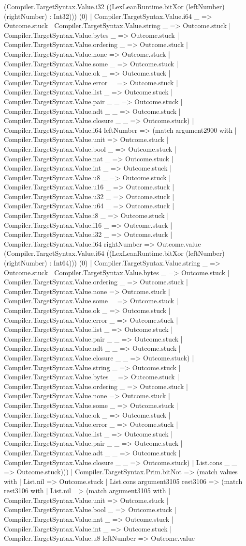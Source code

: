 \documentclass[11pt]{article}
\begin{document}
(Compiler.TargetSyntax.Value.i32 ((LexLeanRuntime.bitXor (leftNumber) (rightNumber) : Int32))) (0) | Compiler.TargetSyntax.Value.i64 \_ => Outcome.stuck | Compiler.TargetSyntax.Value.string \_ => Outcome.stuck | Compiler.TargetSyntax.Value.bytes \_ => Outcome.stuck | Compiler.TargetSyntax.Value.ordering \_ => Outcome.stuck | Compiler.TargetSyntax.Value.none => Outcome.stuck | Compiler.TargetSyntax.Value.some \_ => Outcome.stuck | Compiler.TargetSyntax.Value.ok \_ => Outcome.stuck | Compiler.TargetSyntax.Value.error \_ => Outcome.stuck | Compiler.TargetSyntax.Value.list \_ => Outcome.stuck | Compiler.TargetSyntax.Value.pair \_ \_ => Outcome.stuck | Compiler.TargetSyntax.Value.adt \_ \_ => Outcome.stuck | Compiler.TargetSyntax.Value.closure \_ \_ => Outcome.stuck) | Compiler.TargetSyntax.Value.i64 leftNumber => (match argument2900 with | Compiler.TargetSyntax.Value.unit => Outcome.stuck | Compiler.TargetSyntax.Value.bool \_ => Outcome.stuck | Compiler.TargetSyntax.Value.nat \_ => Outcome.stuck | Compiler.TargetSyntax.Value.int \_ => Outcome.stuck | Compiler.TargetSyntax.Value.u8 \_ => Outcome.stuck | Compiler.TargetSyntax.Value.u16 \_ => Outcome.stuck | Compiler.TargetSyntax.Value.u32 \_ => Outcome.stuck | Compiler.TargetSyntax.Value.u64 \_ => Outcome.stuck | Compiler.TargetSyntax.Value.i8 \_ => Outcome.stuck | Compiler.TargetSyntax.Value.i16 \_ => Outcome.stuck | Compiler.TargetSyntax.Value.i32 \_ => Outcome.stuck | Compiler.TargetSyntax.Value.i64 rightNumber => Outcome.value (Compiler.TargetSyntax.Value.i64 ((LexLeanRuntime.bitXor (leftNumber) (rightNumber) : Int64))) (0) | Compiler.TargetSyntax.Value.string \_ => Outcome.stuck | Compiler.TargetSyntax.Value.bytes \_ => Outcome.stuck | Compiler.TargetSyntax.Value.ordering \_ => Outcome.stuck | Compiler.TargetSyntax.Value.none => Outcome.stuck | Compiler.TargetSyntax.Value.some \_ => Outcome.stuck | Compiler.TargetSyntax.Value.ok \_ => Outcome.stuck | Compiler.TargetSyntax.Value.error \_ => Outcome.stuck | Compiler.TargetSyntax.Value.list \_ => Outcome.stuck | Compiler.TargetSyntax.Value.pair \_ \_ => Outcome.stuck | Compiler.TargetSyntax.Value.adt \_ \_ => Outcome.stuck | Compiler.TargetSyntax.Value.closure \_ \_ => Outcome.stuck) | Compiler.TargetSyntax.Value.string \_ => Outcome.stuck | Compiler.TargetSyntax.Value.bytes \_ => Outcome.stuck | Compiler.TargetSyntax.Value.ordering \_ => Outcome.stuck | Compiler.TargetSyntax.Value.none => Outcome.stuck | Compiler.TargetSyntax.Value.some \_ => Outcome.stuck | Compiler.TargetSyntax.Value.ok \_ => Outcome.stuck | Compiler.TargetSyntax.Value.error \_ => Outcome.stuck | Compiler.TargetSyntax.Value.list \_ => Outcome.stuck | Compiler.TargetSyntax.Value.pair \_ \_ => Outcome.stuck | Compiler.TargetSyntax.Value.adt \_ \_ => Outcome.stuck | Compiler.TargetSyntax.Value.closure \_ \_ => Outcome.stuck) | List.cons \_ \_ => Outcome.stuck))) | Compiler.TargetSyntax.Prim.bitNot => (match values with | List.nil => Outcome.stuck | List.cons argument3105 rest3106 => (match rest3106 with | List.nil => (match argument3105 with | Compiler.TargetSyntax.Value.unit => Outcome.stuck | Compiler.TargetSyntax.Value.bool \_ => Outcome.stuck | Compiler.TargetSyntax.Value.nat \_ => Outcome.stuck | Compiler.TargetSyntax.Value.int \_ => Outcome.stuck | Compiler.TargetSyntax.Value.u8 leftNumber => Outcome.value 
\end{document}
